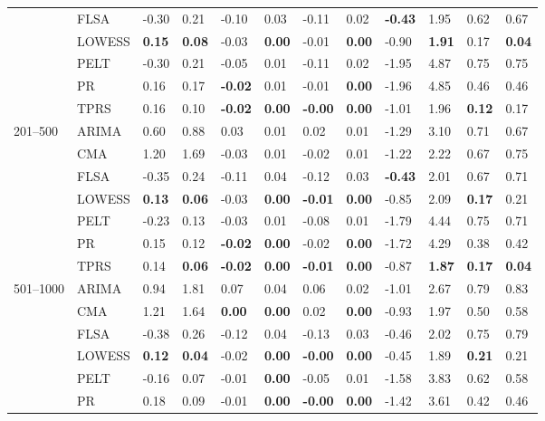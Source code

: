 \begin{table}[ht]
\begin{tabular}{llllllllllll}
   & FLSA & -0.30 & 0.21 & -0.10 & 0.03 & -0.11 & 0.02 & \textbf{-0.43} & 1.95 & 0.62 & 0.67 \\ 
   & LOWESS & \textbf{0.15} & \textbf{0.08} & -0.03 & \textbf{0.00} & -0.01 & \textbf{0.00} & -0.90 & \textbf{1.91} & 0.17 & \textbf{0.04} \\ 
   & PELT & -0.30 & 0.21 & -0.05 & 0.01 & -0.11 & 0.02 & -1.95 & 4.87 & 0.75 & 0.75 \\ 
   & PR & 0.16 & 0.17 & \textbf{-0.02} & 0.01 & -0.01 & \textbf{0.00} & -1.96 & 4.85 & 0.46 & 0.46 \\ 
   & TPRS & 0.16 & 0.10 & \textbf{-0.02} & \textbf{0.00} & \textbf{-0.00} & \textbf{0.00} & -1.01 & 1.96 & \textbf{0.12} & 0.17 \\ 
  201–500 & ARIMA & 0.60 & 0.88 & 0.03 & 0.01 & 0.02 & 0.01 & -1.29 & 3.10 & 0.71 & 0.67 \\ 
   & CMA & 1.20 & 1.69 & -0.03 & 0.01 & -0.02 & 0.01 & -1.22 & 2.22 & 0.67 & 0.75 \\ 
   & FLSA & -0.35 & 0.24 & -0.11 & 0.04 & -0.12 & 0.03 & \textbf{-0.43} & 2.01 & 0.67 & 0.71 \\ 
   & LOWESS & \textbf{0.13} & \textbf{0.06} & -0.03 & \textbf{0.00} & \textbf{-0.01} & \textbf{0.00} & -0.85 & 2.09 & \textbf{0.17} & 0.21 \\ 
   & PELT & -0.23 & 0.13 & -0.03 & 0.01 & -0.08 & 0.01 & -1.79 & 4.44 & 0.75 & 0.71 \\ 
   & PR & 0.15 & 0.12 & \textbf{-0.02} & \textbf{0.00} & -0.02 & \textbf{0.00} & -1.72 & 4.29 & 0.38 & 0.42 \\ 
   & TPRS & 0.14 & \textbf{0.06} & \textbf{-0.02} & \textbf{0.00} & \textbf{-0.01} & \textbf{0.00} & -0.87 & \textbf{1.87} & \textbf{0.17} & \textbf{0.04} \\ 
  501–1000 & ARIMA & 0.94 & 1.81 & 0.07 & 0.04 & 0.06 & 0.02 & -1.01 & 2.67 & 0.79 & 0.83 \\ 
   & CMA & 1.21 & 1.64 & \textbf{0.00} & \textbf{0.00} & 0.02 & \textbf{0.00} & -0.93 & 1.97 & 0.50 & 0.58 \\ 
   & FLSA & -0.38 & 0.26 & -0.12 & 0.04 & -0.13 & 0.03 & -0.46 & 2.02 & 0.75 & 0.79 \\ 
   & LOWESS & \textbf{0.12} & \textbf{0.04} & -0.02 & \textbf{0.00} & \textbf{-0.00} & \textbf{0.00} & -0.45 & 1.89 & \textbf{0.21} & 0.21 \\ 
   & PELT & -0.16 & 0.07 & -0.01 & \textbf{0.00} & -0.05 & 0.01 & -1.58 & 3.83 & 0.62 & 0.58 \\ 
   & PR & 0.18 & 0.09 & -0.01 & \textbf{0.00} & \textbf{-0.00} & \textbf{0.00} & -1.42 & 3.61 & 0.42 & 0.46 \\ 

\end{tabular}
\end{table}
